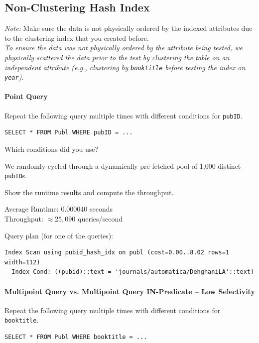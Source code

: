 \documentclass[11pt]{scrartcl}
\begin{document}
\subsection*{Non-Clustering Hash Index}

\emph{Note:} Make sure the data is not physically ordered by the indexed attributes due to the clustering index that you created before. \\
\emph{To ensure the data was not physically ordered by the attribute being tested, we physically scattered the data prior to the test by clustering the table on an independent attribute (e.g., clustering by \texttt{booktitle} before testing the index on \texttt{year}).}

\paragraph{Point Query}

Repeat the following query multiple times with different conditions for \texttt{pubID}.

\begin{lstlisting}[style=dbtsql]
SELECT * FROM Publ WHERE pubID = ...
\end{lstlisting}

Which conditions did you use?

We randomly cycled through a dynamically pre-fetched pool of 1,000 distinct \texttt{pubID}s.

Show the runtime results and compute the throughput.

Average Runtime: 0.000040 seconds \\
Throughput: $\approx 25,090$ queries/second

Query plan (for one of the queries):

{\small
\parskip0pt\begin{verbatim}
Index Scan using pubid_hash_idx on publ (cost=0.00..8.02 rows=1 width=112)
  Index Cond: ((pubid)::text = 'journals/automatica/DehghaniLA'::text)
\end{verbatim}}

\paragraph{Multipoint Query vs. Multipoint Query IN-Predicate -- Low Selectivity}

Repeat the following query multiple times with different conditions for \texttt{booktitle}.

\begin{lstlisting}[style=dbtsql]
SELECT * FROM Publ WHERE booktitle = ...
\end{lstlisting}
\end{document}
